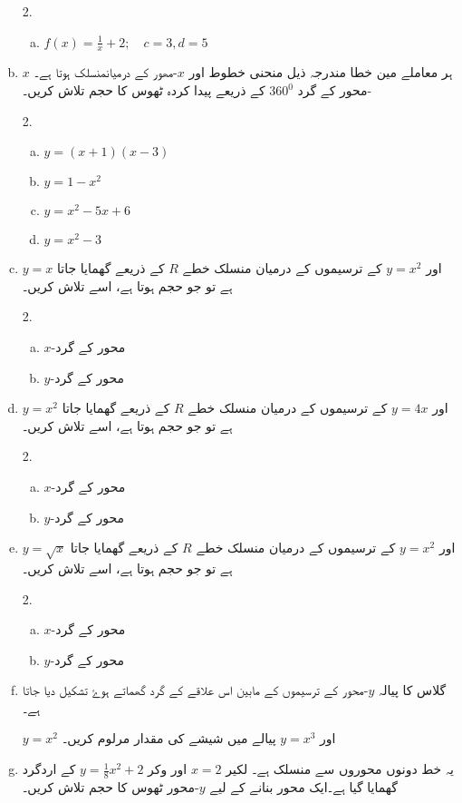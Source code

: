 \begin{enumerate}[a.]
\begin{multicols}{2.}
\begin{enumerate}[a.]
\item
\(f(x)= \frac {1}{x} +2 ; \quad c=3, d=5\)
\end{enumerate}
\end{multicols}
\item
ہر معاملے مین خطا مندرجہ ذیل منحنی خطوط  اور \(x\)-مھور کے درمیانمنسلک ہوتا ہے۔ \(x\)-محور کے گرد \(360^0\) کے ذریعے پیدا کردہ ٹھوس کا حجم تلاش کریں۔
\begin{multicols}{2.}
\begin{enumerate}[a.]
\item
\(y=(x+1)(x-3)\)
\item
\(y=1-x^{2} \)
\item
\(y=x^{2}-5x+6 \)
\item
\(y= x^{2}-3 \)
\end{enumerate}
\end{multicols}
\item
\(y=x \) اور \(y=x^{2}\) کے ترسیموں کے درمیان منسلک خطے \(R\) کے ذریعے گھمایا جاتا ہے تو جو حجم ہوتا ہے، اسے تلاش کریں۔
\begin{multicols}{2.}
\begin{enumerate}[a.]
\item
\(x\)-محور کے گرد
\item
\(y\)-محور کے گرد
\end{enumerate}
\end{multicols}
\item
\(y=x^{2}\) اور \(y=4x \) کے ترسیموں کے درمیان منسلک خطے \(R\) کے ذریعے گھمایا جاتا ہے تو جو حجم ہوتا ہے، اسے تلاش کریں۔
\begin{multicols}{2.}
\begin{enumerate}[a.]
\item
\(x\)-محور کے گرد
\item
\(y\)-محور کے گرد
\end{enumerate}
\end{multicols}
\item
 \(y=\sqrt{x} \) اور \(y=x^{2}\) کے ترسیموں کے درمیان منسلک خطے \(R\) کے ذریعے گھمایا جاتا ہے تو جو حجم ہوتا ہے، اسے تلاش کریں۔
\begin{multicols}{2.}
\begin{enumerate}[a.]
\item
\(x\)-محور کے گرد
\item
\(y\)-محور کے گرد
\end{enumerate}
\end{multicols}
\item
گلاس کا پیالہ \(y\)-محور کے ترسیموں کے مابین اس علاقے کے گرد گھماتے ہوۓ تشکیل دیا جاتا ہے۔

\(y=x^{2}\) اور \(y=x^{3}\) پیالے میں شیشے کی مقدار مرلوم کریں۔
\item
یہ خط دونوں محوروں سے منسلک ہے۔ لکیر \(x=2\) اور وکر \(y=\frac{1}{8} x^{2}+2\) کے اردگرد گھمایا گیا ہے۔ایک محور بنانے کے لیے \(y\)-محور ٹھوس کا حجم تلاش کریں۔
\end{enumerate}


